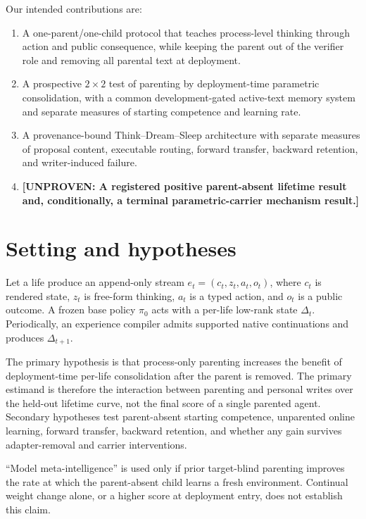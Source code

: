 \documentclass{article}
\newcommand{\unproven}[1]{\textbf{[UNPROVEN: #1]}}
\begin{document}
Our intended contributions are:
\begin{enumerate}
  \item A one-parent/one-child protocol that teaches process-level thinking
        through action and public consequence, while keeping the parent out
        of the verifier role and removing all parental text at deployment.
  \item A prospective $2\times2$ test of parenting by deployment-time
        parametric consolidation, with a common development-gated active-text
        memory system and separate measures of starting competence and
        learning rate.
  \item A provenance-bound Think--Dream--Sleep architecture with separate
        measures of proposal content, executable routing, forward transfer,
        backward retention, and writer-induced failure.
  \item \unproven{A registered positive parent-absent lifetime result and,
        conditionally, a terminal parametric-carrier mechanism result.}
\end{enumerate}

\section{Setting and hypotheses}

Let a life produce an append-only stream
\(e_t=(c_t,z_t,a_t,o_t)\), where \(c_t\) is rendered state, \(z_t\) is
free-form thinking, \(a_t\) is a typed action, and \(o_t\) is a public
outcome. A frozen base policy \(\pi_0\) acts with a per-life low-rank state
\(\Delta_t\). Periodically, an experience compiler admits supported native
continuations and produces \(\Delta_{t+1}\).

The primary hypothesis is that process-only parenting increases the benefit
of deployment-time per-life consolidation after the parent is removed. The
primary estimand is therefore the interaction between parenting and personal
writes over the held-out lifetime curve, not the final score of a single
parented agent. Secondary hypotheses test parent-absent starting competence,
unparented online learning, forward transfer, backward retention, and whether
any gain survives adapter-removal and carrier interventions.

``Model meta-intelligence'' is used only if prior target-blind parenting
improves the rate at which the parent-absent child learns a fresh environment.
Continual weight change alone, or a higher score at deployment entry, does not
establish this claim.
\end{document}
